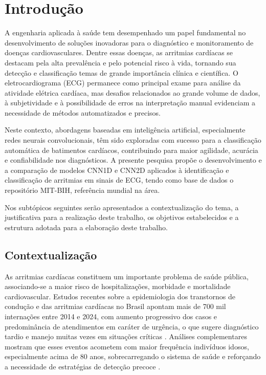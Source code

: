 \chapter[Introdução]{Introdução}

A engenharia aplicada à saúde tem desempenhado um papel fundamental no desenvolvimento de soluções inovadoras para o diagnóstico e monitoramento 
de doenças cardiovasculares. Dentre essas doenças, as arritmias cardíacas se destacam pela alta prevalência e pelo potencial risco à vida, 
tornando sua detecção e classificação temas de grande importância clínica e científica. O eletrocardiograma (ECG) permanece como principal 
exame para análise da atividade elétrica cardíaca, mas desafios relacionados ao grande volume de dados, à subjetividade e à possibilidade de 
erros na interpretação manual evidenciam a necessidade de métodos automatizados e precisos.

Neste contexto, abordagens baseadas em inteligência artificial, especialmente redes neurais convolucionais, têm sido exploradas com sucesso para 
a classificação automática de batimentos cardíacos, contribuindo para maior agilidade, acurácia e confiabilidade nos diagnósticos. A presente 
pesquisa propõe o desenvolvimento e a comparação de modelos CNN1D e CNN2D aplicados à identificação e classificação de arritmias em sinais de 
ECG, tendo como base de dados o repositório MIT-BIH, referência mundial na área.

Nos subtópicos seguintes serão apresentados a contextualização do tema, a justificativa para a realização deste trabalho, os objetivos 
estabelecidos e a estrutura adotada para a elaboração deste trabalho.

\section{Contextualização}

As arritmias cardíacas constituem um importante problema de saúde pública, associando-se a maior risco de hospitalizações, morbidade e mortalidade 
cardiovascular. Estudos recentes sobre a epidemiologia dos transtornos de condução e das arritmias cardíacas no Brasil apontam mais de 700 mil 
internações entre 2014 e 2024, com aumento progressivo dos casos e predominância de atendimentos em caráter de urgência, o que sugere diagnóstico 
tardio e manejo muitas vezes em situações críticas . Análises complementares mostram que esses eventos acometem com maior 
frequência indivíduos idosos, especialmente acima de 80 anos, sobrecarregando o sistema de saúde e reforçando a necessidade de estratégias de 
detecção precoce .

